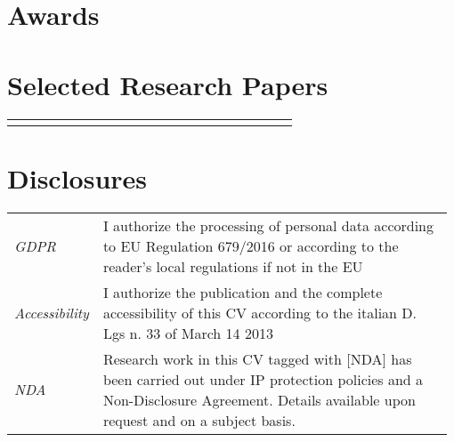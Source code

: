 \documentclass{ExpressiveResume}
\begin{document}
\vspace{0.1cm}
\section{Awards}

\vspace{0.1cm}


\section{Selected Research Papers}
\vspace{-0.55cm}
\noindent\begin{tabular}{@{} >{\raggedleft}p{0.055\linewidth}
 p{0.875\linewidth}}
&  %
\setlength{\labelsep}{0.5cm}
 \\
\end{tabular}

\nocite{fu2023recent}
\section{Disclosures}

\noindent\begin{tabular}{@{} >{\raggedleft}p{0.1\linewidth}
 p{0.875\linewidth}}
 
\textit{GDPR} & I authorize the processing of personal data according to EU Regulation 679/2016 or according to the reader's local regulations if not in the EU \\
\textit{Accessibility} & I authorize the publication and the complete accessibility of this CV according to the italian D. Lgs n. 33 of March 14 2013 \\
\textit{NDA} & Research work in this CV tagged with [NDA] has been carried out under IP protection policies and a Non-Disclosure Agreement. Details available upon request and on a subject basis. \\
\end{tabular}
\end{document}
